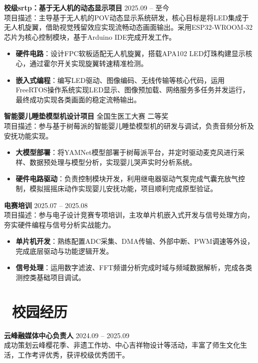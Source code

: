 \documentclass[11pt]{article}
\newlength{\interProjectSpacing}
\newcommand{\projectsep}{\vspace{\interProjectSpacing}}
\newlength{\intraProjectTitleSep}
\newcommand{\titlebreak}{\\[\intraProjectTitleSep]}
\newlength{\intraProjectListTopSep}
\begin{document}
\textbf{校级srtp：基于无人机的动态显示项目} \hfill 2025.09 -- 至今 \titlebreak
项目描述：主导基于无人机的POV动态显示系统研发，核心目标是将LED集成于无人机旋翼，借助视觉残留效应实现流畅动态画面输出。采用ESP32‑WROOM‑32芯片为核心控制模块，基于Arduino IDE完成开发工作。
\begin{itemize}[nosep, topsep=\intraProjectListTopSep]
    \item \textbf{硬件电路}：设计FPC软板适配无人机旋翼，搭载APA102 LED灯珠构建显示核心，通过霍尔开关实现旋翼转速精准检测。
    \item \textbf{嵌入式编程}：编写LED驱动、图像编码、无线传输等核心代码，运用FreeRTOS操作系统实现LED显示、图像预加载、网络服务多任务并发运行，最终成功实现各类画面的稳定流畅输出。
\end{itemize}
\projectsep
\textbf{智能婴儿睡垫模型机设计项目} \hfill 全国生医工大赛 二等奖 \titlebreak
项目描述：参与基于树莓派的智能婴儿睡垫模型机的研发与调试，负责音频分析及安抚功能实现。
\begin{itemize}[nosep, topsep=\intraProjectListTopSep]
    \item \textbf{大模型部署}：将YAMNet模型部署于树莓派平台，并定时驱动麦克风进行采样、数据预处理与模型分析，实现婴儿哭声实时分析系统。
    \item \textbf{硬件电路驱动}：负责控制模块开发，利用继电器驱动气泵完成气囊充放气控制，模拟摇摇床动作实现婴儿安抚功能，项目顺利完成原型验证。
\end{itemize}
\projectsep
\textbf{电赛培训} \hfill 2025.07 -- 2025.08 \titlebreak
项目描述：参与电子设计竞赛专项培训，主攻单片机嵌入式开发与信号处理方向，夯实硬件编程与信号分析实战能力。
\begin{itemize}[nosep, topsep=\intraProjectListTopSep]
    \item \textbf{单片机开发}：熟练配置ADC采集、DMA传输、外部中断、PWM调速等外设，完成底层驱动与功能逻辑开发。
    \item \textbf{信号处理}：运用数字滤波、FFT频谱分析完成时域与频域数据解析，完成各类测控类基础项目调试。
\end{itemize}

\section{\makebox[\widthof{\faUsers}][c]{\color{CVBlue}\faUsers}\ 校园经历}
\textbf{云峰融媒体中心负责人} \hfill 2024.09 -- 2025.09 \titlebreak
成功策划云峰樱花季、非遗工作坊、中心吉祥物设计等活动，丰富了师生文化生活，工作考评优秀，获评校级优秀团干。

\projectsep
\end{document}
